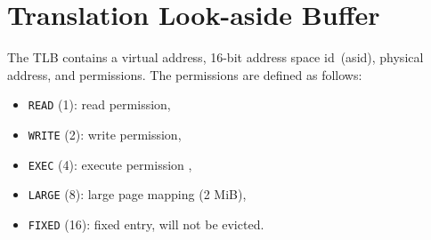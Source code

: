\section{Translation Look-aside Buffer}
\label{sec:tlb}

The TLB contains a virtual address, 16-bit address space id~(asid), physical address, and
permissions. The permissions are defined as follows:

\begin{itemize}
  \item \texttt{READ} (1): read permission,
  \item \texttt{WRITE} (2): write permission,
  \item \texttt{EXEC} (4): execute permission ,
  \item \texttt{LARGE} (8): large page mapping (2 MiB),
  \item \texttt{FIXED} (16): fixed entry, will not be evicted.
\end{itemize}
\extend{}
